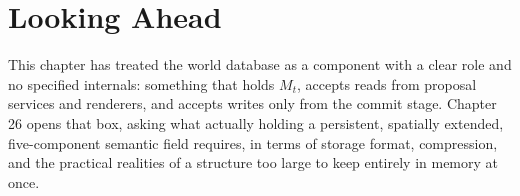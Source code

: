 \section{Looking Ahead}

This chapter has treated the world database as a component with a clear role and no specified internals: something that holds \(M_t\), accepts reads from proposal services and renderers, and accepts writes only from the commit stage. Chapter 26 opens that box, asking what actually holding a persistent, spatially extended, five-component semantic field requires, in terms of storage format, compression, and the practical realities of a structure too large to keep entirely in memory at once.
